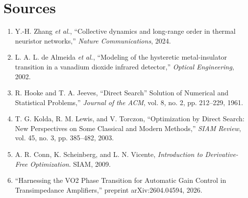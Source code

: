 \documentclass[11pt]{article}
\begin{document}
\section{Sources}
\begin{enumerate}
    \item Y.-H. Zhang \emph{et al.}, ``Collective dynamics and long-range order in thermal neuristor networks,'' \emph{Nature Communications}, 2024.
    \item L. A. L. de Almeida \emph{et al.}, ``Modeling of the hysteretic metal-insulator transition in a vanadium dioxide infrared detector,'' \emph{Optical Engineering}, 2002.
    \item R. Hooke and T. A. Jeeves, ``Direct Search'' Solution of Numerical and Statistical Problems,'' \emph{Journal of the ACM}, vol. 8, no. 2, pp. 212--229, 1961.
    \item T. G. Kolda, R. M. Lewis, and V. Torczon, ``Optimization by Direct Search: New Perspectives on Some Classical and Modern Methods,'' \emph{SIAM Review}, vol. 45, no. 3, pp. 385--482, 2003.
    \item A. R. Conn, K. Scheinberg, and L. N. Vicente, \emph{Introduction to Derivative-Free Optimization}. SIAM, 2009.
    \item ``Harnessing the VO2 Phase Transition for Automatic Gain Control in Transimpedance Amplifiers,'' preprint arXiv:2604.04594, 2026.
\end{enumerate}
\end{document}
